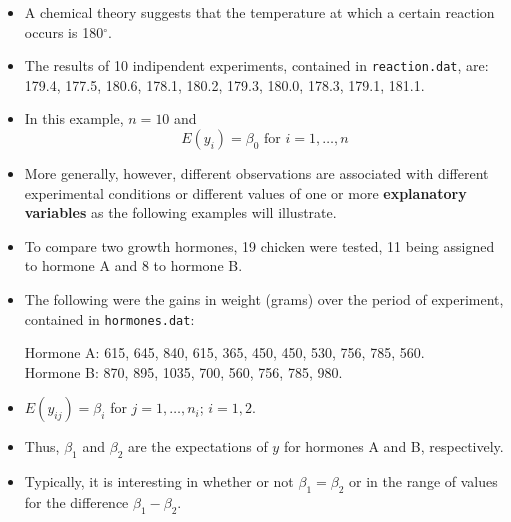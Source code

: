 \begin{frame}
  \begin{itemize}
    \vspace{0.25cm}
    \item A chemical theory suggests that the temperature at which a certain reaction occurs is 180$^\circ$.
    \vspace{0.25cm}
    \item The results of 10 indipendent experiments, contained in \texttt{reaction.dat}, are:\\
      179.4, 177.5, 180.6, 178.1, 180.2, 179.3, 180.0, 178.3, 179.1, 181.1.
    \vspace{0.25cm}
    \item In this example, $ n = 10 $ and
      $$ E(y_i) = \beta_0 \text{ for } i = 1, \dots, n $$
    \item More generally, however, different observations are associated with different experimental conditions or different values of one or more \textbf{explanatory variables} as the following examples will illustrate.
  \end{itemize}
\end{frame}




\begin{frame}
  \begin{itemize}
    \vspace{0.2cm}
    \item To compare two growth hormones, 19 chicken were tested, 11 being assigned to hormone A and 8 to hormone B. 
    \vspace{0.2cm}
    \item The following were the gains in weight (grams) over the period of experiment, contained in \texttt{hormones.dat}:\\
      \vspace{0.2cm}
      \begin{footnotesize}
        \hspace{1cm} Hormone A: 615, 645, 840, 615, 365, 450, 450, 530, 756, 785, 560. \\
        \hspace{1cm} Hormone B: 870, 895, 1035, 700, 560, 756, 785, 980.       
      \end{footnotesize}
    \vspace{0.2cm}
    \item $ E(y_{ij}) = \beta_{i} $ for $ j = 1, \dots, n_i $; $ i = 1, 2 $.
    \vspace{0.2cm}
    \item Thus, $ \beta_{1} $ and $ \beta_{2} $ are the expectations of $ y $ for hormones A and B, respectively.
    \vspace{0.2cm}
    \item Typically, it is interesting in whether or not $ \beta_{1} = \beta_{2} $ or in the range of values for the difference $ \beta_{1} - \beta_{2} $.
  \end{itemize}
\end{frame}


